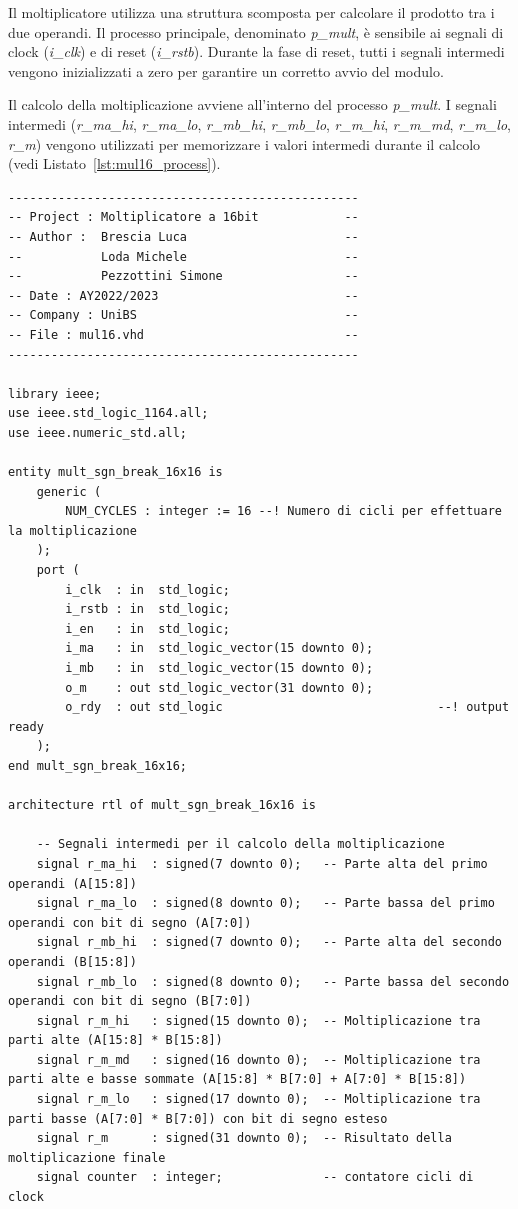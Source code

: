 \documentclass[titlepage]{report}
\begin{document}
		Il moltiplicatore utilizza una struttura scomposta per calcolare il prodotto tra i due operandi. Il processo principale, denominato \textit{p\_mult}, è sensibile ai segnali di clock (\textit{i\_clk}) e di reset (\textit{i\_rstb}). Durante la fase di reset, tutti i segnali intermedi vengono inizializzati a zero per garantire un corretto avvio del modulo.
		
		Il calcolo della moltiplicazione avviene all'interno del processo \textit{p\_mult}. I segnali intermedi (\textit{r\_ma\_hi}, \textit{r\_ma\_lo}, \textit{r\_mb\_hi}, \textit{r\_mb\_lo}, \textit{r\_m\_hi}, \textit{r\_m\_md}, \textit{r\_m\_lo}, \textit{r\_m}) vengono utilizzati per memorizzare i valori intermedi durante il calcolo (vedi Listato~\ref{lst:mul16_process}).
		
		\begin{lstlisting}[caption={\textbf{mul16.vhd} - architettura del motiplicatore a 16 bit}, label={lst:mul16_process}]
-------------------------------------------------
-- Project : Moltiplicatore a 16bit            --
-- Author :  Brescia Luca                      -- 
--           Loda Michele                      --
--           Pezzottini Simone                 --
-- Date : AY2022/2023                          --
-- Company : UniBS                             --
-- File : mul16.vhd                            --
-------------------------------------------------

library ieee;
use ieee.std_logic_1164.all;
use ieee.numeric_std.all;

entity mult_sgn_break_16x16 is
	generic (
		NUM_CYCLES : integer := 16 --! Numero di cicli per effettuare la moltiplicazione
	);
	port ( 
		i_clk  : in  std_logic;
		i_rstb : in  std_logic;
		i_en   : in  std_logic;
		i_ma   : in  std_logic_vector(15 downto 0);
		i_mb   : in  std_logic_vector(15 downto 0);
		o_m    : out std_logic_vector(31 downto 0);
		o_rdy  : out std_logic								--! output ready
	);
end mult_sgn_break_16x16;

architecture rtl of mult_sgn_break_16x16 is

	-- Segnali intermedi per il calcolo della moltiplicazione
	signal r_ma_hi  : signed(7 downto 0);   -- Parte alta del primo operandi (A[15:8])
	signal r_ma_lo  : signed(8 downto 0);   -- Parte bassa del primo operandi con bit di segno (A[7:0])
	signal r_mb_hi  : signed(7 downto 0);   -- Parte alta del secondo operandi (B[15:8])
	signal r_mb_lo  : signed(8 downto 0);   -- Parte bassa del secondo operandi con bit di segno (B[7:0])
	signal r_m_hi   : signed(15 downto 0);  -- Moltiplicazione tra parti alte (A[15:8] * B[15:8])
	signal r_m_md   : signed(16 downto 0);  -- Moltiplicazione tra parti alte e basse sommate (A[15:8] * B[7:0] + A[7:0] * B[15:8])
	signal r_m_lo   : signed(17 downto 0);  -- Moltiplicazione tra parti basse (A[7:0] * B[7:0]) con bit di segno esteso
	signal r_m      : signed(31 downto 0);  -- Risultato della moltiplicazione finale
	signal counter  : integer;              -- contatore cicli di clock


\end{lstlisting}
\end{document}
